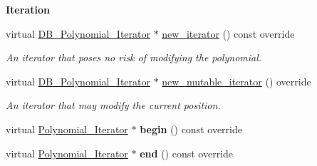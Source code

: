 \begin{Indent}\textbf{ Iteration}\par
\begin{DoxyCompactItemize}
\item 
\mbox{\label{group__polygroup_a224ae300d1789243ca05e4413c473a6f}} 
virtual \hyperlink{group___iterator_group_class_d_b___polynomial___iterator}{D\+B\+\_\+\+Polynomial\+\_\+\+Iterator} $\ast$ \hyperlink{group__polygroup_a224ae300d1789243ca05e4413c473a6f}{new\+\_\+iterator} () const override
\begin{DoxyCompactList}\small\item\em An iterator that poses no risk of modifying the polynomial. \end{DoxyCompactList}\item 
\mbox{\label{group__polygroup_aabbde4f088511cb480e959eaac056784}} 
virtual \hyperlink{group___iterator_group_class_d_b___polynomial___iterator}{D\+B\+\_\+\+Polynomial\+\_\+\+Iterator} $\ast$ \hyperlink{group__polygroup_aabbde4f088511cb480e959eaac056784}{new\+\_\+mutable\+\_\+iterator} () override
\begin{DoxyCompactList}\small\item\em An iterator that may modify the current position. \end{DoxyCompactList}\item 
\mbox{\label{group__polygroup_a85169b0b1146537bb69127f3c1a866ff}} 
virtual \hyperlink{group___iterator_group_class_polynomial___iterator}{Polynomial\+\_\+\+Iterator} $\ast$ {\bfseries begin} () const override
\item 
\mbox{\label{group__polygroup_ad89a902fa53246364fbef37eefa44080}} 
virtual \hyperlink{group___iterator_group_class_polynomial___iterator}{Polynomial\+\_\+\+Iterator} $\ast$ {\bfseries end} () const override
\end{DoxyCompactItemize}
\end{Indent}
